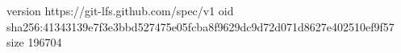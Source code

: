 version https://git-lfs.github.com/spec/v1
oid sha256:41343139e7f3e3bbd527475e05fcba8f9629dc9d72d071d8627e402510ef9f57
size 196704
